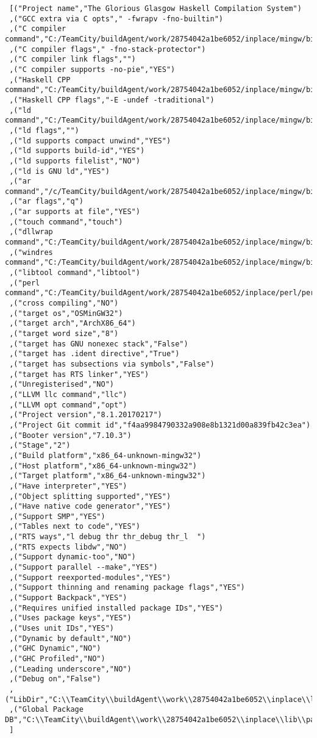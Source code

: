 \begin{verbatim}
 [("Project name","The Glorious Glasgow Haskell Compilation System")
 ,("GCC extra via C opts"," -fwrapv -fno-builtin")
 ,("C compiler command","C:/TeamCity/buildAgent/work/28754042a1be6052/inplace/mingw/bin/gcc.exe")
 ,("C compiler flags"," -fno-stack-protector")
 ,("C compiler link flags","")
 ,("C compiler supports -no-pie","YES")
 ,("Haskell CPP command","C:/TeamCity/buildAgent/work/28754042a1be6052/inplace/mingw/bin/gcc.exe")
 ,("Haskell CPP flags","-E -undef -traditional")
 ,("ld command","C:/TeamCity/buildAgent/work/28754042a1be6052/inplace/mingw/bin/ld.exe")
 ,("ld flags","")
 ,("ld supports compact unwind","YES")
 ,("ld supports build-id","YES")
 ,("ld supports filelist","NO")
 ,("ld is GNU ld","YES")
 ,("ar command","/c/TeamCity/buildAgent/work/28754042a1be6052/inplace/mingw/bin/ar")
 ,("ar flags","q")
 ,("ar supports at file","YES")
 ,("touch command","touch")
 ,("dllwrap command","C:/TeamCity/buildAgent/work/28754042a1be6052/inplace/mingw/bin/dllwrap.exe")
 ,("windres command","C:/TeamCity/buildAgent/work/28754042a1be6052/inplace/mingw/bin/windres.exe")
 ,("libtool command","libtool")
 ,("perl command","C:/TeamCity/buildAgent/work/28754042a1be6052/inplace/perl/perl")
 ,("cross compiling","NO")
 ,("target os","OSMinGW32")
 ,("target arch","ArchX86_64")
 ,("target word size","8")
 ,("target has GNU nonexec stack","False")
 ,("target has .ident directive","True")
 ,("target has subsections via symbols","False")
 ,("target has RTS linker","YES")
 ,("Unregisterised","NO")
 ,("LLVM llc command","llc")
 ,("LLVM opt command","opt")
 ,("Project version","8.1.20170217")
 ,("Project Git commit id","f4aa9984790332a908e8b1321d00a839fb42c3ea")
 ,("Booter version","7.10.3")
 ,("Stage","2")
 ,("Build platform","x86_64-unknown-mingw32")
 ,("Host platform","x86_64-unknown-mingw32")
 ,("Target platform","x86_64-unknown-mingw32")
 ,("Have interpreter","YES")
 ,("Object splitting supported","YES")
 ,("Have native code generator","YES")
 ,("Support SMP","YES")
 ,("Tables next to code","YES")
 ,("RTS ways","l debug thr thr_debug thr_l  ")
 ,("RTS expects libdw","NO")
 ,("Support dynamic-too","NO")
 ,("Support parallel --make","YES")
 ,("Support reexported-modules","YES")
 ,("Support thinning and renaming package flags","YES")
 ,("Support Backpack","YES")
 ,("Requires unified installed package IDs","YES")
 ,("Uses package keys","YES")
 ,("Uses unit IDs","YES")
 ,("Dynamic by default","NO")
 ,("GHC Dynamic","NO")
 ,("GHC Profiled","NO")
 ,("Leading underscore","NO")
 ,("Debug on","False")
 ,("LibDir","C:\\TeamCity\\buildAgent\\work\\28754042a1be6052\\inplace\\lib")
 ,("Global Package DB","C:\\TeamCity\\buildAgent\\work\\28754042a1be6052\\inplace\\lib\\package.conf.d")
 ]
\end{verbatim}
